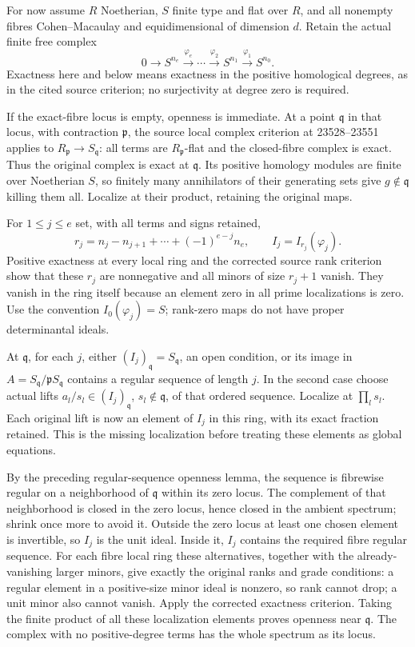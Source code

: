 For now assume \(R\) Noetherian, \(S\) finite type and flat over \(R\), and all nonempty fibres Cohen--Macaulay and equidimensional of dimension \(d\). Retain the actual finite free complex \[
0\longrightarrow S^{n_e}\xrightarrow{\varphi_e}\cdots
\xrightarrow{\varphi_2}S^{n_1}\xrightarrow{\varphi_1}S^{n_0}.
\] Exactness here and below means exactness in the positive homological degrees, as in the cited source criterion; no surjectivity at degree zero is required.

If the exact-fibre locus is empty, openness is immediate. At a point \(\mathfrak q\) in that locus, with contraction \(\mathfrak p\), the source local complex criterion at 23528--23551 applies to \(R_{\mathfrak p}\to S_{\mathfrak q}\): all terms are \(R_{\mathfrak p}\)-flat and the closed-fibre complex is exact. Thus the original complex is exact at \(\mathfrak q\). Its positive homology modules are finite over Noetherian \(S\), so finitely many annihilators of their generating sets give \(g\notin\mathfrak q\) killing them all. Localize at their product, retaining the original maps.

For \(1\leq j\leq e\) set, with all terms and signs retained, \[
r_j=n_j-n_{j+1}+\cdots+(-1)^{e-j}n_e,\qquad
I_j=I_{r_j}(\varphi_j).
\] Positive exactness at every local ring and the corrected source rank criterion show that these \(r_j\) are nonnegative and all minors of size \(r_j+1\) vanish. They vanish in the ring itself because an element zero in all prime localizations is zero. Use the convention \(I_0(\varphi_j)=S\); rank-zero maps do not have proper determinantal ideals.

At \(\mathfrak q\), for each \(j\), either \((I_j)_{\mathfrak q}=S_{\mathfrak q}\), an open condition, or its image in \(A=S_{\mathfrak q}/\mathfrak pS_{\mathfrak q}\) contains a regular sequence of length \(j\). In the second case choose actual lifts \(a_l/s_l\in(I_j)_{\mathfrak q}\), \(s_l\notin\mathfrak q\), of that ordered sequence. Localize at \(\prod_l s_l\). Each original lift is now an element of \(I_j\) in this ring, with its exact fraction retained. This is the missing localization before treating these elements as global equations.

By the preceding regular-sequence openness lemma, the sequence is fibrewise regular on a neighborhood of \(\mathfrak q\) within its zero locus. The complement of that neighborhood is closed in the zero locus, hence closed in the ambient spectrum; shrink once more to avoid it. Outside the zero locus at least one chosen element is invertible, so \(I_j\) is the unit ideal. Inside it, \(I_j\) contains the required fibre regular sequence. For each fibre local ring these alternatives, together with the already-vanishing larger minors, give exactly the original ranks and grade conditions: a regular element in a positive-size minor ideal is nonzero, so rank cannot drop; a unit minor also cannot vanish. Apply the corrected exactness criterion. Taking the finite product of all these localization elements proves openness near \(\mathfrak q\). The complex with no positive-degree terms has the whole spectrum as its locus.

